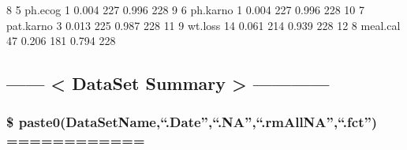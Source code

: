 \documentclass[
]{article}
\newenvironment{Shaded}{\begin{snugshade}}{\end{snugshade}}
\newcommand{\DecValTok}[1]{\textcolor[rgb]{0.00,0.00,0.81}{#1}}
\newcommand{\FloatTok}[1]{\textcolor[rgb]{0.00,0.00,0.81}{#1}}
\newcommand{\NormalTok}[1]{#1}
\begin{document}
\begin{Shaded}
\begin{Highlighting}[]
\DecValTok{8}       \DecValTok{5}\NormalTok{         ph.ecog    }\DecValTok{1}     \FloatTok{0.004}   \DecValTok{227}      \FloatTok{0.996}  \DecValTok{228}
\DecValTok{9}       \DecValTok{6}\NormalTok{        ph.karno    }\DecValTok{1}     \FloatTok{0.004}   \DecValTok{227}      \FloatTok{0.996}  \DecValTok{228}
\DecValTok{10}      \DecValTok{7}\NormalTok{       pat.karno    }\DecValTok{3}     \FloatTok{0.013}   \DecValTok{225}      \FloatTok{0.987}  \DecValTok{228}
\DecValTok{11}      \DecValTok{9}\NormalTok{         wt.loss   }\DecValTok{14}     \FloatTok{0.061}   \DecValTok{214}      \FloatTok{0.939}  \DecValTok{228}
\DecValTok{12}      \DecValTok{8}\NormalTok{        meal.cal   }\DecValTok{47}     \FloatTok{0.206}   \DecValTok{181}      \FloatTok{0.794}  \DecValTok{228}
\end{Highlighting}
\end{Shaded}

\hypertarget{dataset-summary}{%
\subsection{------ \textless{} DataSet Summary \textgreater{}
------------}\label{dataset-summary}}

\hypertarget{paste0datasetname.date.na.rmallna.fct}{%
\subsubsection{\$
paste0(DataSetName,``.Date'',``.NA'',``.rmAllNA'',``.fct'')
============}\label{paste0datasetname.date.na.rmallna.fct}}
\end{document}
